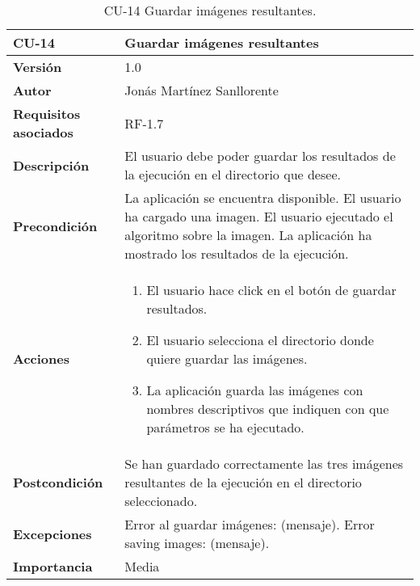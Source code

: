 \begin{table}[p]
	\centering
	\begin{tabularx}{\linewidth}{ p{} p{} }
		\toprule
		\textbf{CU-14}    & \textbf{Guardar imágenes resultantes}\\
		\toprule
		\textbf{Versión}              & 1.0    \\
		\textbf{Autor}                & Jonás Martínez Sanllorente \\
		\textbf{Requisitos asociados} & RF-1.7 \\
		\textbf{Descripción}          & El usuario debe poder guardar los resultados de la ejecución en el directorio que desee. \\
		\textbf{Precondición}         & La aplicación se encuentra disponible.\newline
                                        El usuario ha cargado una imagen.\newline
                                        El usuario ejecutado el algoritmo sobre la imagen.\newline
                                        La aplicación ha mostrado los resultados de la ejecución.\\
		\textbf{Acciones}             &
		\begin{enumerate}
			\def\labelenumi{\arabic{enumi}.}
			\tightlist
			\item El usuario hace click en el botón de guardar resultados.
			\item El usuario selecciona el directorio donde quiere guardar las imágenes.
            \item La aplicación guarda las imágenes con nombres descriptivos que indiquen con que parámetros se ha ejecutado.
		\end{enumerate}\\
		\textbf{Postcondición}        & Se han guardado correctamente las tres imágenes resultantes de la ejecución en el directorio seleccionado. \\
		\textbf{Excepciones}          & Error al guardar imágenes: (mensaje).\newline
                                        Error saving images: (mensaje).\\
		\textbf{Importancia}          & Media \\
		\bottomrule
	\end{tabularx}
	\caption{CU-14 Guardar imágenes resultantes.}
\end{table}

